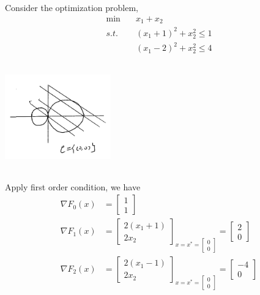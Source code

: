 \begin{example}
Consider the optimization problem,
\begin{align*}
\min \quad & x_1+x_2\\
s.t. \quad & (x_1+1)^2 + x_2^2 \leq 1\\
&(x_1-2)^2 + x_2^2 \leq 4
\end{align*}

\begin{marginfigure}
	\centering
	\includegraphics[width=1.8in,height=1.8in]{figures/ch10/figure1204_5.png}
\end{marginfigure}

Apply first order condition, we have
\begin{align*}
\nabla F_0(x) &=\begin{bmatrix}
1\\
1
\end{bmatrix}\\
\nabla F_1(x) &=\begin{bmatrix}
2(x_1+1)\\
2x_2
\end{bmatrix}_{x=x^*=\begin{bmatrix}
	0\\
	0
	\end{bmatrix}}=\begin{bmatrix}
2\\
0
\end{bmatrix}\\
\nabla F_2(x) &=\begin{bmatrix}
2(x_1-1)\\
2x_2
\end{bmatrix}_{x=x^*=\begin{bmatrix}
	0\\
	0
	\end{bmatrix}}=\begin{bmatrix}
-4\\
0
\end{bmatrix}\\
\end{align*}


\end{example}



